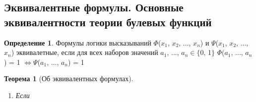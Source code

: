 \documentclass[a4paper]{article}
\newtheorem{theorem}{Теорема}[section]
\theoremstyle{definition}
\newtheorem*{definition}{Определение}
\theoremstyle{remark}
\begin{document}
    \subsection{Эквивалентные формулы. Основные эквивалентности теории булевых функций}
	\begin{definition}
		Формулы логики высказываний 	$\Phi$($x_1$, $x_2$, ..., $x_n$) и $\Psi$($x_1$, $x_2$, ..., $x_n$) эквивалетные, если для всех наборов значений $a_1$, ..., $a_n\in\{$0, 1$\}$
		$\Phi$($a_1$, ..., $a_n$) = 1 $\Leftrightarrow \Psi$($a_1$, ..., $a_n$) = 1
	\end{definition}
    \begin{theorem}[Об эквивалентных формулах]
        \begin{enumerate}
            \item Если $$
        \end{enumerate}
    \end{theorem}
\end{document}
